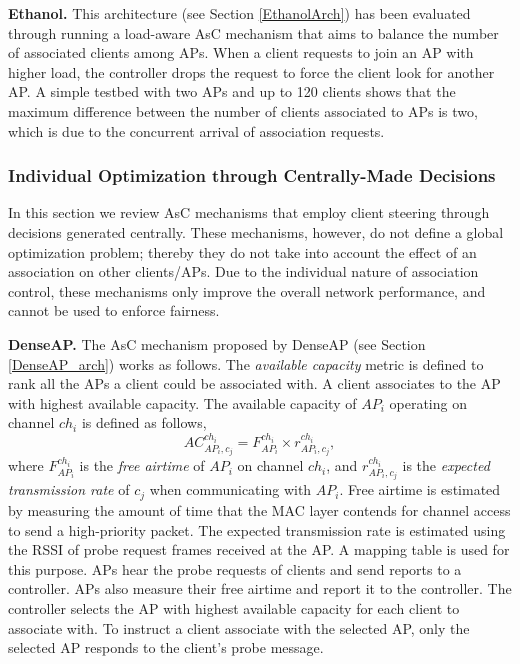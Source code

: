 \textbf{Ethanol.}
This architecture \cite{Ethanol} (see Section \ref{EthanolArch}) has been evaluated through running a load-aware AsC mechanism that aims to balance the number of associated clients among APs.
When a client requests to join an AP with higher load, the controller drops the request to force the client look for another AP.
A simple testbed with two APs and up to 120 clients shows that the maximum difference between the number of clients associated to APs is two, which is due to the concurrent arrival of association requests.





\subsubsection{\textbf{Individual Optimization through Centrally-Made Decisions}}
\label{AM-InvidualOpt}
In this section we review AsC mechanisms that employ client steering through decisions generated centrally. 
These mechanisms, however, do not define a global optimization problem; thereby they do not take into account the effect of an association on other clients/APs.
Due to the individual nature of association control, these mechanisms only improve the overall network performance, and cannot be used to enforce fairness.



\textbf{DenseAP.}
\label{DenseAP-AM}
The AsC mechanism proposed by DenseAP \cite{DenseAP} (see Section \ref{DenseAP_arch}) works as follows.
The \textit{available capacity} metric is defined to rank all the APs a client could be associated with. 
A client associates to the AP with highest available capacity. 
The available capacity of $AP_{i}$ operating on channel $ch_{i}$ is defined as follows,
\begin{equation}
AC_{AP_{i},c_{j}}^{ch_{i}} = F_{AP_{i}}^{ch_{i}} \times r_{AP_{i},c_{j}}^{ch_{i}},
\end{equation} 
where $F_{AP_{i}}^{ch_{i}} $ is the \textit{free airtime} of $AP_{i}$ on channel $ch_{i}$, and $r_{AP_{i},c_{j}}^{ch_{i}}$ is the \textit{expected transmission rate} of $c_{j}$ when communicating with $AP_{i}$.
Free airtime is estimated by measuring the amount of time that the MAC layer contends for channel access to send a high-priority packet.
The expected transmission rate is estimated using the RSSI of probe request frames received at the AP. 
A mapping table is used for this purpose.
APs hear the probe requests of clients and send reports to a controller. 
APs also measure their free airtime and report it to the controller. 
The controller selects the AP with highest available capacity for each client to associate with. 
To instruct a client associate with the selected AP, only the selected AP responds to the client's probe message. 

